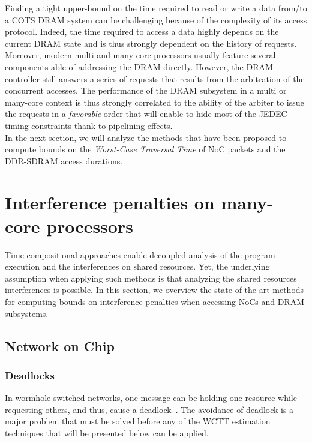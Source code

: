 \documentclass[main.tex]{subfiles}
\begin{document}
Finding a tight upper-bound on the time required to read or write a data from/to a COTS DRAM system can be challenging because of the complexity of its access protocol. Indeed, the time required to access a data highly depends on the current DRAM state and is thus strongly dependent on the history of requests. Moreover, modern multi and many-core processors usually feature several components able of addressing the DRAM directly. However, the DRAM controller still answers a series of requests that results from the arbitration of the concurrent accesses. The performance of the DRAM subsystem in a multi or many-core context is thus strongly correlated to the ability of the arbiter to issue the requests in a \emph{favorable} order that will enable to hide most of the JEDEC timing constraints thank to pipelining effects. \\

In the next section, we will analyze the methods that have been proposed to compute bounds on the \emph{Worst-Case Traversal Time} of NoC packets and the DDR-SDRAM access durations.













\section{Interference penalties on many-core processors}
\label{sec_stateOfTheArt_interferencePenalties}

Time-compositional approaches enable decoupled analysis of the program execution and the interferences on shared resources. Yet, the underlying assumption when applying such methods is that analyzing the shared resources interferences is possible. In this section, we overview the state-of-the-art methods for computing bounds on interference penalties when accessing NoCs and DRAM subsystems.

\subsection{Network on Chip}
\label{sssec_stateOfTheArt_Noc_timingguarantees}

\subsubsection{Deadlocks}
\label{sssec_stateOfTheArt_Noc_deadlocks}
In wormhole switched networks, one message can be holding one resource while requesting others, and thus, cause a deadlock~\cite{Duato1993, Fleury98}. The avoidance of deadlock is a major problem that must be solved before any of the WCTT estimation techniques that will be presented below can be applied.
\end{document}
